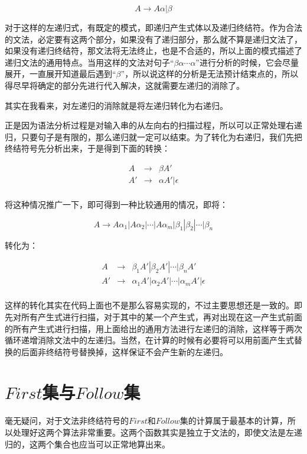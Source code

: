 $$
    A \rightarrow A \alpha | \beta
$$

对于这样的左递归式，有既定的模式，即递归产生式体以及递归终结符。作为合法的文法，必定要有这两个部分，如果没有了递归部分，那么就不算是递归文法了，如果没有递归终结符，那文法将无法终止，也是不合适的，所以上面的模式描述了递归文法的通用特点。当用这样的文法对句子“$\beta \alpha \cdots \alpha$”进行分析的时候，它会尽量展开，一直展开知道最后遇到“$\beta$”，所以说这样的分析是无法预计结束点的，所以得尽早将确定的部分先进行代入解决，这就需要左递归的消除了。\begin{bfseries}其实在我看来，对左递归的消除就是将左递归转化为右递归。\end{bfseries}正是因为语法分析过程是对输入串的从左向右的扫描过程，所以可以正常处理右递归，只要句子是有限的，那么递归就一定可以结束。为了转化为右递归，我们先把终结符号先分析出来，于是得到下面的转换：

\begin{eqnarray*}
    A  & \rightarrow & \beta A' \\
    A' & \rightarrow & \alpha A' | \epsilon \\
\end{eqnarray*}

将这种情况推广一下，即可得到一种比较通用的情况，即将：

$$
    A \rightarrow A \alpha_1 | A \alpha_2 | \cdots | A \alpha_m 
                  | \beta_1  | \beta_2    | \cdots | \beta_n
$$

转化为：

\begin{eqnarray*}
    A  & \rightarrow & \beta_1 A'| \beta_2 A' | \cdots | \beta_n A' \\
    A' & \rightarrow & \alpha_1 A' | \alpha_2 A' | \cdots | \alpha_m A' | \epsilon \\
\end{eqnarray*}

这样的转化其实在代码上面也不是那么容易实现的，不过主要思想还是一致的。即先对所有产生式进行扫描，对于其中的某一个产生式，再对出现在这一产生式前面的所有产生式进行扫描，用上面给出的通用方法进行左递归的消除，这样等于两次循环递增消除文法中的左递归。当然，在计算的时候有必要将可以用前面产生式替换的后面非终结符号替换掉，这样保证不会产生新的左递归。

\section{$First$集与$Follow$集}

毫无疑问，对于文法非终结符号的$First$和$Follow$集的计算属于最基本的计算，所以处理好这两个算法非常重要。这两个函数其实是独立于文法的，即使文法是左递归的，这两个集合也应当可以正常地算出来。

